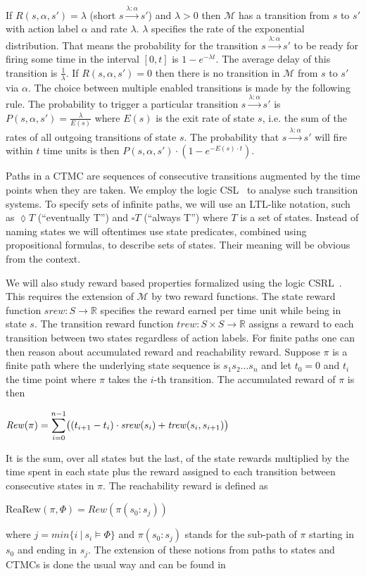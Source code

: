 \documentclass[a4paper, 10pt]{article}
\begin{document}
If $R(s, \alpha, s') = \lambda$ (short $s \xrightarrow{\lambda : \alpha} s'$) and $\lambda > 0$ then $\mathcal{M}$ has a transition from $s$ to $s'$ with action label $\alpha$ and rate $\lambda$.
$\lambda$ specifies the rate of the exponential distribution. That means the probability for the transition $s \xrightarrow{\lambda : \alpha} s'$ to be ready for firing some time in the interval $[0,t]$ is $1-e^{- \lambda t}$. The average delay of this transition is $\frac{1}{\lambda}$.
If $R(s, \alpha, s') = 0$ then there is no transition in $\mathcal{M}$ from $s$ to $s'$ via $\alpha$.
The choice between multiple enabled transitions is made by the following rule.
The probability to trigger a particular transition $s \xrightarrow{\lambda : \alpha} s'$ is $P(s, \alpha, s') = \frac{\lambda}{E(s)}$ where $E(s)$ is the exit rate of state $s$, i.e. the sum of the rates of all outgoing transitions of state $s$.
The probability that $s \xrightarrow{\lambda : \alpha} s'$ will fire within $t$ time units is then $P(s, \alpha, s') \cdot (1 - e^{- E(s) \cdot t})$.

Paths in a CTMC are sequences of consecutive transitions augmented by the time points when they are taken.
We employ the logic CSL~\cite{assb96, bhhk00, knp07} to analyse such transition systems.
To specify sets of infinite paths, we will use an LTL-like notation, such as $\lozenge T$ (``eventually T'') and $\square T$ (``always T'') where $T$ is a set of states.
Instead of naming states we will oftentimes use state predicates, combined using propositional formulas, to describe sets of states. Their meaning will be obvious from the context.

We will also study reward based properties formalized using the logic CSRL~\cite{bhhk00, knp07}.
This requires the extension of $\mathcal{M}$ by two reward functions. The state reward function $\mathit{srew} : S \rightarrow \mathbb{R}$ specifies the reward earned per time unit while being in state $s$. The transition reward function $\mathit{trew} : S \times S \rightarrow \mathbb{R}$ assigns a reward to each transition between two states regardless of action labels.
For finite paths one can then reason about accumulated reward and reachability reward.
Suppose $\pi$ is a finite path where the underlying state sequence is $s_1 s_2 ...s_n$ and let $t_0 = 0$ and $t_i$ the time point where $\pi$ takes the $i$-th transition.
The accumulated reward of $\pi$ is then
\begin{center}
	$\mathit{Rew}(\pi) = \mathlarger{\sum}\limits_{i=0}^{n-1} \big( (t_{i+1} - t_i) \cdot \mathit{srew}(s_i) + \mathit{trew}(s_i, s_{i+1}) \big)$
\end{center}
It is the sum, over all states but the last, of the state rewards multiplied by the time spent in each state plus the reward assigned to each transition between consecutive states in $\pi$.
The reachability reward is defined as
\begin{center}
	$\mathrm{ReaRew}(\pi, \Phi) = \mathit{Rew}(\pi(s_0:s_j))$
\end{center}
where $j = min \{ i~|~s_i \models \Phi \}$ and  $\pi(s_0:s_j)$ stands for the sub-path of $\pi$ starting in $s_0$ and ending in $s_j$.
The extension of these notions from paths to states and CTMCs is done the usual way and can be found in \cite{bhhk03}
\end{document}
